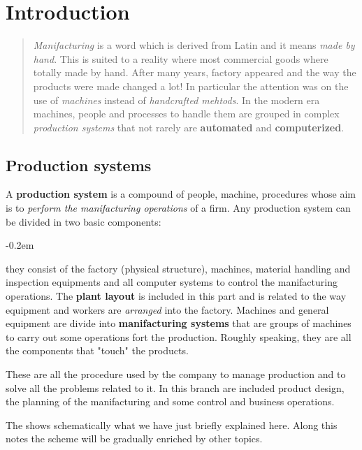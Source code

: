\chapter{Introduction}

\begin{quotation}
    \noindent
    \textsf{\textit{Manifacturing} is a word which is derived from Latin and it means \textit{made by hand}. This is suited to a reality where most commercial goods where totally made by hand. After many years, factory appeared and the way the products were made changed a lot! In particular the attention was on the use of \textit{machines} instead of \textit{handcrafted mehtods}. In the modern era machines, people and processes to handle them are grouped in complex \textit{production systems} that not rarely are \textbf{automated} and \textbf{computerized}.  
    }
\end{quotation}

\section{Production systems}
A \textbf{production system} is a compound of people, machine, procedures whose aim is to \textit{perform the manifacturing operations} of a firm. Any production system can be divided in two basic components: 
\begin{description}
    \itemsep-0.2em
    \item[\textsc{Facilities}] they consist of the factory (physical structure), machines, material handling and inspection equipments and all computer systems to control the manifacturing operations. The \textbf{plant layout} is included in this part and is related to the way equipment and workers are \textit{arranged} into the factory. Machines and general equipment are divide into \textbf{manifacturing systems} that are groups of machines to carry out some operations fort the production. Roughly speaking, they are all the components that "touch" the products.
    \item[\textsc{Manifacturing support systems}]  These are all the procedure used by the company to manage production and to solve all the problems related to it. In this branch are included product design, the planning of the manifacturing and some control and business operations.
\end{description}
\noindent
The   shows schematically what we have just briefly explained here. Along this notes the scheme will be gradually enriched by other topics. 

